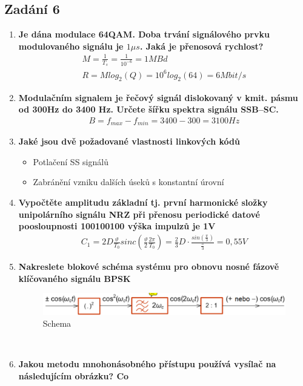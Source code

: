 \subsection{Zadání 6}
\begin{enumerate}
    \item \textbf{Je dána modulace 64QAM. Doba trvání signálového prvku modulovaného signálu je \(1\mu s\). Jaká je přenosová rychlost?}
    \begin{gather*}
        M = \frac{1}{T_s} = \frac{1}{10^{-6}} = 1MBd\\
        R = Mlog_2(Q) = 10^6log_2(64) = 6Mbit/s
    \end{gather*}
    \item \textbf{Modulačním signalem je řečový signál dislokovaný v kmit. pásmu od 300Hz do 3400 Hz.
    Určete šířku spektra signálu SSB–SC.}
    \begin{gather*}
        B = f_{max} - f_{min} = 3400 - 300 = 3100Hz
    \end{gather*}
    \item \textbf{Jaké jsou dvě požadované vlastnosti linkových kódů}
    \begin{itemize}
        \item Potlačení SS signálů
        \item Zabránění vzniku dalších úseků s konstantní úrovní
    \end{itemize}
    \item \textbf{Vypočtěte amplitudu základní tj. první harmonické složky unipolárního signálu NRZ při
    přenosu periodické datové poosloupnosti 100100100 výška impulzů je 1V}
    \begin{gather*}
        C_1 = 2D\frac{\vartheta}{T_0}sinc(\frac{\vartheta}{2}\frac{2\pi}{T_0}) = \frac{2}{3}D\cdot \frac{sin(\frac{\pi}{3})}{\frac{\pi}{3}} = 0,55V
    \end{gather*}
    \item \textbf{Nakreslete blokové schéma systému pro obnovu nosné fázově klíčovaného signálu BPSK}
    \begin{figure}[h]
        \centering
        \includegraphics[scale = 0.3]{images/DemodBPSK.png}
        \caption{Schema}
    \end{figure}\\
    \item \textbf{Jakou metodu mnohonásobného přístupu používá vysílač na následujícím obrázku? Co
}
\end{enumerate}
